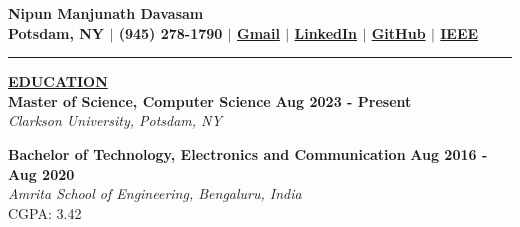\documentclass{article}
\begin{document}
\begin{center}
\thispagestyle{empty}
\large \textbf{Nipun Manjunath Davasam \\}
\normalsize \textbf{Potsdam, NY $\mid$ (945) 278-1790 $\mid$ \href{mailto:nipun.mdavasam@gmail.com}{Gmail} $\mid$ \href{https://www.linkedin.com/in/nipun-davasam}{LinkedIn} $\mid$ \href{https://github.com/nipun-davasam}{GitHub} $\mid$ \href{https://ieeexplore.ieee.org/document/9297916}{IEEE} \\}
\rule{\textwidth}{1pt}
\end{center}










\noindent \textbf{\underline{EDUCATION}} \\
\textbf{ Master of Science, Computer Science } \hfill \textbf{Aug 2023 - Present} \\
\textit{ Clarkson University, Potsdam, NY}  
\begin{itemize}[noitemsep,nolistsep,leftmargin=*]
\end{itemize}
\begin{itemize}
\end{itemize}
\textbf{Bachelor of Technology, Electronics and Communication} \hfill \textbf{Aug 2016 - Aug 2020} \\
\textit{Amrita School of Engineering, Bengaluru, India} \\
CGPA: 3.42 \\
% 
%
\end{document}
